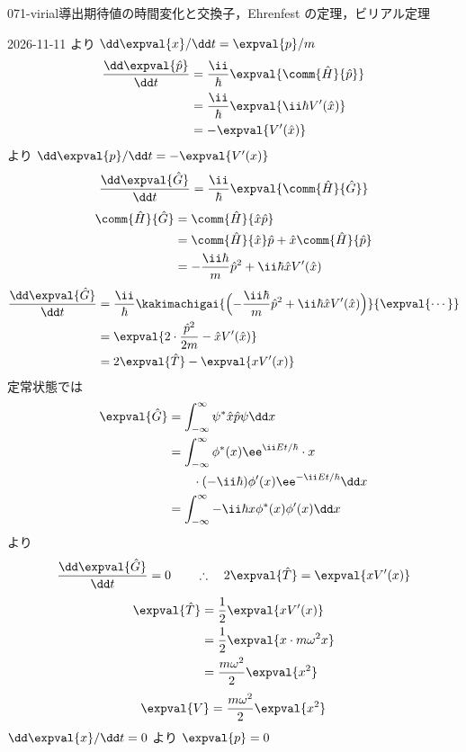 \documentclass[uplatex,dvipdfmx,a4paper,11pt]{jsarticle}
\begin{document}
\begin{mondai}{071-virial}{導出}{期待値の時間変化と交換子，Ehrenfest の定理，ビリアル定理}
\begin{kotaeutsushi}{2026-11-11}
より $\dd\expval{x}/\dd t=\expval{p}/m$
\begin{align*}
\frac{\dd\expval{\hat{p}}}{\dd t}&=\frac{\ii}{\hbar}\expval{\comm{\hat{H}}{\hat{p}}}\\
&=\frac{\ii}{\hbar}\expval{\ii\hbar V'(\hat{x})}\\
&=-\expval{V'(\hat{x})}
\end{align*}
より $\dd\expval{p}/\dd t=-\expval{V'(x)}$
\[ \frac{\dd\expval{\hat{G}}}{\dd t}=\frac{\ii}{\hbar}\expval{\comm{\hat{H}}{\hat{G}}} \]
\begin{align*}
\comm{\hat{H}}{\hat{G}}&=\comm{\hat{H}}{\hat{x}\hat{p}}\\
&=\comm{\hat{H}}{\hat{x}}\hat{p}+\hat{x}\comm{\hat{H}}{\hat{p}}\\
&=-\frac{\ii\hbar}{m}\hat{p}^{2}+\ii\hbar\hat{x}V'(\hat{x})
\end{align*}
\begin{align*}
\frac{\dd\expval{\hat{G}}}{\dd t}&=\frac{\ii}{\hbar}\kakimachigai{\Bigl(-\frac{\ii\hbar}{m}\hat{p}^{2}+\ii\hbar\hat{x}V'(\hat{x})\Bigr)}{\expval{\cdots}}\\
&=\expval{2\cdot\frac{\hat{p}^{2}}{2m}-\hat{x}V'(\hat{x})}\\
&=2\expval{\hat{T}}-\expval{xV'(x)}
\end{align*}
定常状態では
\begin{align*}
\expval{\hat{G}}&=\int_{-\infty}^{\infty}\psi^{*}\hat{x}\hat{p}\psi\dd x\\
&=\int_{-\infty}^{\infty}\phi^{*}(x)\ee^{\ii Et/\hbar}\cdot x\\
&\qquad\cdot(-\ii\hbar)\phi'(x)\ee^{-\ii Et/\hbar}\dd x\\
&=\int_{-\infty}^{\infty}-\ii\hbar x\phi^{*}(x)\phi'(x)\dd x
\end{align*}
より
\[ \frac{\dd\expval{\hat{G}}}{\dd t}=0\qquad\therefore\quad2\expval{\hat{T}}=\expval{xV'(x)} \]
\begin{align*}
\expval{\hat{T}}&=\frac{1}{2}\expval{xV'(x)}\\
&=\frac{1}{2}\expval{x\cdot m\omega^{2}x}\\
&=\frac{m\omega^{2}}{2}\expval{x^{2}}
\end{align*}
\[ \expval{V}=\frac{m\omega^{2}}{2}\expval{x^{2}} \]
$\dd\expval{x}/\dd t=0$ より $\expval{p}=0$


\end{kotaeutsushi}
\end{mondai}
\end{document}
